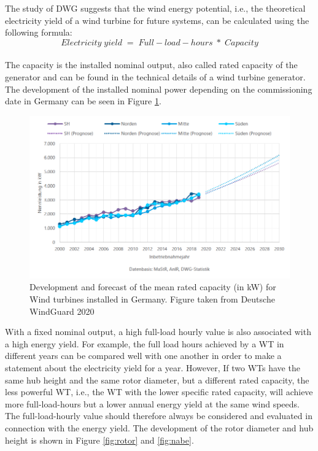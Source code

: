 \documentclass[a4paper,11pt]{article}
\begin{document}
The study of DWG suggests that the wind energy potential, i.e., the theoretical electricity yield of a wind turbine for future systems, can be calculated using the following formula:
\[
Electricity\;yield\; =\; Full-load-hours\; *\; Capacity
\]\\
The capacity is the installed nominal output, also called rated capacity of the generator and can be found in the technical details of a wind turbine generator. The development of the installed nominal power depending on the commissioning date in Germany can be seen in Figure \ref{fig:capacity}.
\begin{figure}[H]

{\centering \includegraphics[width=1\linewidth]{figures/DWG/DWG_Nennleistung} 

}

\caption{Development and forecast of the mean rated capacity (in kW) for Wind turbines installed in Germany. Figure taken from Deutsche WindGuard 2020}\label{fig:capacity}
\end{figure}
With a fixed nominal output, a high full-load hourly value is also associated with a high energy yield. For example, the full load hours achieved by a WT in different years can be compared well with one another in order to make a statement about the electricity yield for a year. However, If two WTs have the same hub height and the same rotor diameter, but a different rated capacity, the less powerful WT, i.e., the WT with the lower specific rated capacity, will achieve more full-load-hours but a lower annual energy yield at the same wind speeds. The full-load-hourly value should therefore always be considered and evaluated in connection with the energy yield. The development of the rotor diameter and hub height is shown in Figure \ref{fig:rotor} and \ref{fig:nabe}.
\end{document}
